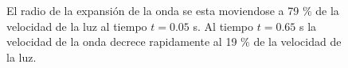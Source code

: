 \documentclass[12pt,a4paper]{book}
\begin{document}
\begin{figure}
\caption{\label{fig:bwlax-rel08_97}El radio de la expansión de la onda se esta moviendose a 79 \% de la velocidad de la luz al tiempo $t = 0.05$ s. Al tiempo $t = 0.65$ s la velocidad de la onda decrece rapidamente al 19 \% de la velocidad de la luz.} 
\end{figure}



\begin{figure}
\centering
{}

\end{figure}
\end{document}
